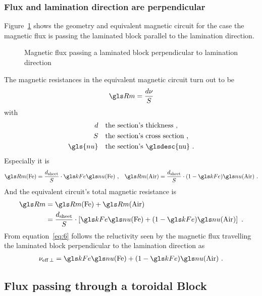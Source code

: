 \subsubsection{Flux and lamination direction are perpendicular}
\label{sec:perp-lamin-direct}

Figure~\ref{fig:Lam-Mat-Flux-perpendicular} shows the geometry and
equivalent magnetic circuit for the case the magnetic flux is passing
the laminated block parallel to the lamination direction.
\begin{figure}
  \centering
  \hfil
  \caption{Magnetic flux passing a laminated block perpendicular to lamination direction}
  \label{fig:Lam-Mat-Flux-perpendicular}
\end{figure}
The magnetic resistances in the equivalent magnetic circuit turn out to be
\begin{gather}
  \label{eq:25}
  \Rm=\frac{d\nu}{S}
\end{gather}
with
\begin{align*}
  d&\quad\text{the section's thickness}\text{~,}\\
  S&\quad\text{the section's cross section}\text{~,}\\
  \gls{nu}&\quad\text{the section's \glsdesc{nu}}\text{~.}
\end{align*}
Especially it is
\begin{align}
  \RmFe=\frac{\dsheet}{S}\cdot\kFe\nuFe\text{~,} &&
  \RmAir=\frac{\dsheet}{S}\cdot(1-\kFe)\nuAir\text{~.}
\end{align}
And the equivalent circuit's total magnetic resistance is
\begin{gather}
  \label{eq:6}
  \begin{split}
    \Rm&=\RmFe + \RmAir \\
    &=\frac{\dsheet}{S}\cdot\left[\kFe\nuFe+(1-\kFe)\nuAir\right]\text{~.}
  \end{split}
\end{gather}
From equation~\eqref{eq:6} follows the reluctivity seen by the
magnetic flux travelling the laminated block perpendicular to the
lamination direction as
\begin{gather}
  \nueffperp= \kFe\nuFe+(1-\kFe)\nuAir \text{~.}
\end{gather}


\subsection{Flux passing through a toroidal Block}
\label{sec:cylinder-coordinates}

